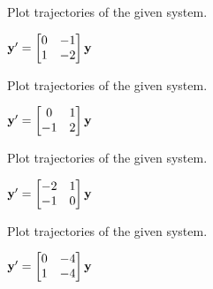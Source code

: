 \documentclass{ximera}
\begin{document}
 \begin{problem}\label{exer:10.5.42} 
 Plot trajectories of the given system.
 
 ${\bf y}'=  \begin{bmatrix}0&-1\\1&-2\end{bmatrix}{\bf y}$
  \end{problem}

 \begin{problem}\label{exer:10.5.43} 
 Plot trajectories of the given system.
 
 ${\bf y}'=  \begin{bmatrix}0&1\\-1&2\end{bmatrix}{\bf y}$
 \end{problem}


 \begin{problem}\label{exer:10.5.44} 
 Plot trajectories of the given system.
 
 ${\bf y}'=  \begin{bmatrix}-2&1\\-1&0\end{bmatrix}{\bf y}$
  \end{problem}

 \begin{problem}\label{exer:10.5.45}
 Plot trajectories of the given system.
 
 ${\bf y}'=  \begin{bmatrix}0&-4\\1&-4\end{bmatrix}{\bf y}$
 \end{problem}
\end{document}
